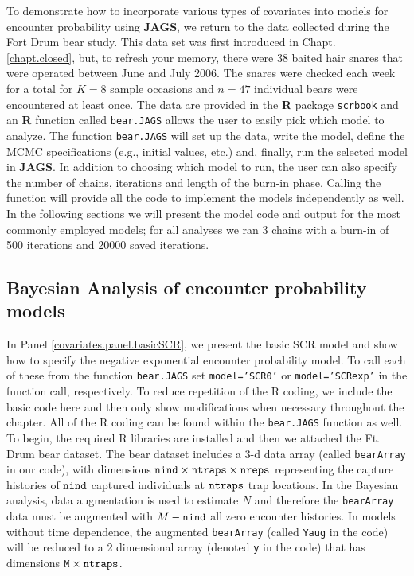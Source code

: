 To demonstrate how to incorporate various types of covariates into
models for encounter probability using {\bf JAGS}, we return to the
data collected during the Fort Drum bear study.  This data set was first
introduced in Chapt. \ref{chapt.closed}, but, to refresh your memory,
there were 38 baited hair snares that were operated between June and
July 2006.  The snares were checked each week for a total for $K=8$
sample occasions and $n=47$ individual bears were encountered at least
once.  The data are provided in the {\bf R} package \mbox{\tt scrbook}
and an {\bf R} function called {\tt bear.JAGS} allows the user to
easily pick which model to analyze.  The function {\tt bear.JAGS} will
set up the data, write the model, define the MCMC specifications
(e.g., initial values, etc.) and, finally, run the selected model in
{\bf JAGS}. In addition to choosing which model to run, the user can
also specify the number of chains, iterations and length of the
burn-in phase. Calling the function will provide all the code to
implement the models independently as well.  In the following sections
we will present the model code and output for the most commonly
employed models; for all analyses we ran 3 chains with a burn-in of
500 iterations and 20000 saved iterations.

\subsection{Bayesian Analysis of encounter probability models}

In Panel \ref{covariates.panel.basicSCR}, we present the basic SCR
model and show how to specify the negative exponential encounter
probability model.
  To call each of these from the function {\tt bear.JAGS} set
{\tt model='SCR0'} or {\tt model='SCRexp'} in the function call,
respectively.  To reduce repetition of the R coding, we include the
basic code here and then only show modifications when necessary throughout
the chapter.  All of the R coding can be found within the {\tt bear.JAGS}
function as well.   To begin, the required R libraries are installed and 
then we attached the Ft. Drum bear dataset.  The bear dataset includes 
a 3-d data array (called \mbox{\tt bearArray} in our code), 
with dimensions $\mbox{\tt nind} \times \mbox{\tt ntraps} \times \mbox{\tt nreps}$ 
representing the capture histories of $\mbox{\tt nind}$ captured individuals at
$\mbox{\tt ntraps}$ trap locations.  In the Bayesian analysis, data augmentation is
used to estimate $N$ and therefore the \mbox{\tt bearArray} data must be augmented with
$M - \mbox{\tt nind}$ all zero encounter histories.  In models without time dependence,
the augmented \mbox{\tt bearArray} (called \mbox{\tt Yaug} in the code) will be reduced
to a 2 dimensional array (denoted \mbox{\tt y} in the code) that has dimensions 
 $\mbox{\tt M} \times \mbox{\tt ntraps}$.

